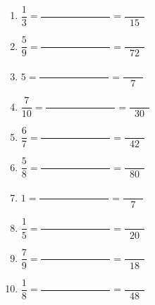 \documentclass[9pt]{article}
\begin{document}
\begin{multicols}{2}
\begin{exercice}
\begin{enumerate}
	\item $\dfrac{1}{3} = \dfrac{\phantom{00000000000000}}{\phantom{00000000000000}} = $$\dfrac{\phantom{0000}}{15}$
	\item $\dfrac{5}{9} = \dfrac{\phantom{00000000000000}}{\phantom{00000000000000}} = $$\dfrac{\phantom{0000}}{72}$
	\item $5 = \dfrac{\phantom{00000000000000}}{\phantom{00000000000000}} = \dfrac{\phantom{0000}}{7}$
	\item $\dfrac{7}{10} = \dfrac{\phantom{00000000000000}}{\phantom{00000000000000}} = $$\dfrac{\phantom{0000}}{30}$
	\item $\dfrac{6}{7} = \dfrac{\phantom{00000000000000}}{\phantom{00000000000000}} = $$\dfrac{\phantom{0000}}{42}$
	\item $\dfrac{5}{8} = \dfrac{\phantom{00000000000000}}{\phantom{00000000000000}} = $$\dfrac{\phantom{0000}}{80}$
	\item $1 = \dfrac{\phantom{00000000000000}}{\phantom{00000000000000}} = \dfrac{\phantom{0000}}{7}$
	\item $\dfrac{1}{5} = \dfrac{\phantom{00000000000000}}{\phantom{00000000000000}} = $$\dfrac{\phantom{0000}}{20}$
	\item $\dfrac{7}{9} = \dfrac{\phantom{00000000000000}}{\phantom{00000000000000}} = $$\dfrac{\phantom{0000}}{18}$
	\item $\dfrac{1}{8} = \dfrac{\phantom{00000000000000}}{\phantom{00000000000000}} = $$\dfrac{\phantom{0000}}{48}$
\end{enumerate}
\end{exercice}


\end{multicols}
\end{document}

